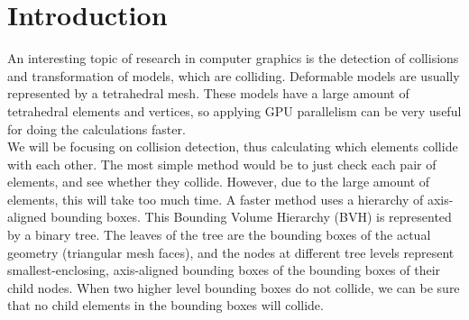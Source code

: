 \section{Introduction}
An interesting topic of research in computer graphics is the detection of collisions and transformation of models, which are colliding. Deformable models are usually represented by a tetrahedral mesh. These models have a large amount of tetrahedral elements and vertices, so applying GPU parallelism can be very useful for doing the calculations faster.\\
We will be focusing on collision detection, thus calculating which elements collide with each other. The most simple method would be to just check each pair of elements, and see whether they collide. However, due to the large amount of elements, this will take too much time. A faster method uses a hierarchy of axis-aligned bounding boxes. This Bounding Volume Hierarchy (BVH) is represented by a binary tree. The leaves of the tree are the bounding boxes of the actual geometry (triangular mesh faces), and the nodes at different tree levels represent smallest-enclosing, axis-aligned bounding boxes of the bounding boxes of their child nodes. When two higher level bounding boxes do not collide, we can be sure that no child elements in the bounding boxes will collide.\\

